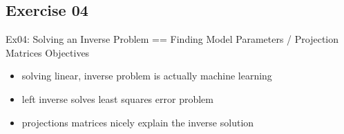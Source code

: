 \documentclass[mathserif, aspectratio=1610]{intbeamer}
\begin{document}


\subsection{Exercise 04}

\begin{frame}{Ex04: Solving an Inverse Problem == Finding Model Parameters / Projection Matrices}
Objectives
\begin{itemize}
\item solving linear, inverse problem is actually machine learning
\item left inverse solves least squares error problem
\item projections matrices nicely explain the inverse solution
\end{itemize}
\end{frame}
\end{document}

